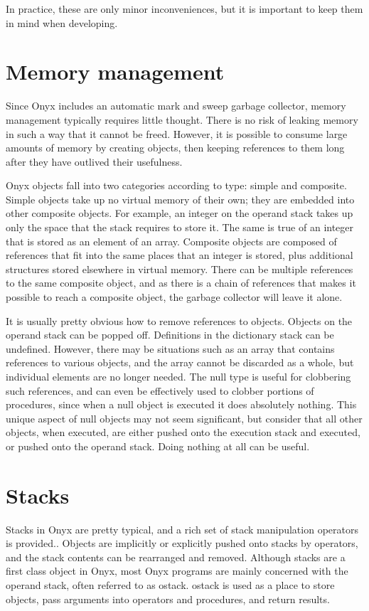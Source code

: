 In practice, these are only minor inconveniences, but it is important to keep
them in mind when developing.

\section{Memory management}

Since Onyx includes an automatic mark and sweep garbage collector, memory
management typically requires little thought.  There is no risk of leaking
memory in such a way that it cannot be freed.  However, it is possible to
consume large amounts of memory by creating objects, then keeping references to
them long after they have outlived their usefulness.

Onyx objects fall into two categories according to type: simple and composite.
Simple objects take up no virtual memory of their own; they are embedded into
other composite objects.  For example, an integer on the operand stack takes up
only the space that the stack requires to store it.  The same is true of an
integer that is stored as an element of an array.  Composite objects are
composed of references that fit into the same places that an integer is stored,
plus additional structures stored elsewhere in virtual memory.  There can be
multiple references to the same composite object, and as there is a chain of
references that makes it possible to reach a composite object, the garbage
collector will leave it alone.

It is usually pretty obvious how to remove references to objects.  Objects on
the operand stack can be popped off.  Definitions in the dictionary stack can be
undefined.  However, there may be situations such as an array that contains
references to various objects, and the array cannot be discarded as a whole, but
individual elements are no longer needed.  The null type is useful for
clobbering such references, and can even be effectively used to clobber portions
of procedures, since when a null object is executed it does absolutely nothing.
This unique aspect of null objects may not seem significant, but consider that
all other objects, when executed, are either pushed onto the execution stack and
executed, or pushed onto the operand stack.  Doing nothing at all can be useful.

\section{Stacks}

Stacks in Onyx are pretty typical, and a rich set of stack manipulation
operators is provided..  Objects are implicitly or explicitly pushed onto stacks
by operators, and the stack contents can be rearranged and removed.  Although
stacks are a first class object in Onyx, most Onyx programs are mainly concerned
with the operand stack, often referred to as ostack.  ostack is used as a place
to store objects, pass arguments into operators and procedures, and return
results.

